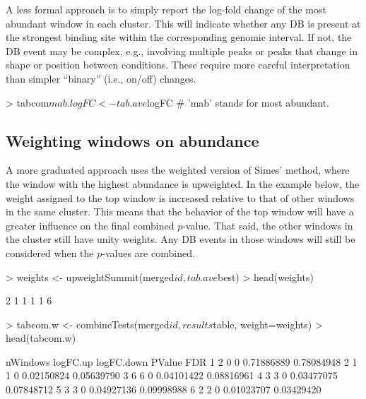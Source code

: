 \documentclass[12pt]{report}
\renewenvironment{Schunk}{\vspace{0pt}}{\vspace{0pt}}
\begin{document}
A less formal approach is to simply report the log-fold change of the most abundant window in each cluster.
This will indicate whether any DB is present at the strongest binding site within the corresponding genomic interval.
If not, the DB event may be complex, e.g., involving multiple peaks or peaks that change in shape or position between conditions.
These require more careful interpretation than simpler ``binary'' (i.e., on/off) changes.

\begin{Schunk}
\begin{Sinput}
> tabcom$mab.logFC <- tab.ave$logFC # 'mab' stands for most abundant.
\end{Sinput}
\end{Schunk}

\subsection{Weighting windows on abundance}
A more graduated approach uses the weighted version of Simes' method, where the window with the highest abundance is upweighted.
In the example below, the weight assigned to the top window is increased relative to that of other windows in the same cluster.
This means that the behavior of the top window will have a greater influence on the final combined $p$-value.
That said, the other windows in the cluster still have unity weights.
Any DB events in those windows will still be considered when the $p$-values are combined.

\begin{Schunk}
\begin{Sinput}
> weights <- upweightSummit(merged$id, tab.ave$best)
> head(weights)
\end{Sinput}
\begin{Soutput}
[1] 2 1 1 1 1 6
\end{Soutput}
\begin{Sinput}
> tabcom.w <- combineTests(merged$id, results$table, weight=weights)
> head(tabcom.w)
\end{Sinput}
\begin{Soutput}
  nWindows logFC.up logFC.down     PValue        FDR
1        2        0          0 0.71886889 0.78084948
2        1        1          0 0.02150824 0.05639790
3        6        6          0 0.04101422 0.08816961
4        3        3          0 0.03477075 0.07848712
5        3        3          0 0.04927136 0.09998988
6        2        2          0 0.01023707 0.03429420
\end{Soutput}
\end{Schunk}
\end{document}
